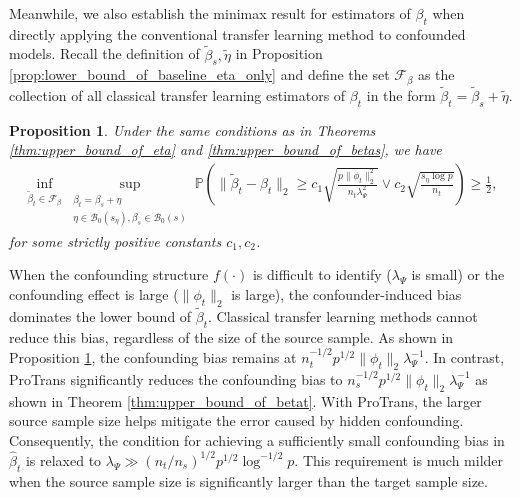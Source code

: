 \documentclass[12pt]{article}
\newtheorem{prop}{Proposition}
\begin{document}
Meanwhile, we also establish the minimax result for estimators of $\beta_t$ when directly applying the conventional transfer learning method to confounded models. Recall the definition of $\tilde{\beta}_s,\tilde{\eta}$ in Proposition \ref{prop:lower_bound_of_baseline_eta_only} and define the set $\mathcal{F}_\beta$ as the collection of all classical transfer learning estimators of $\beta_t$ in the form $ \tilde{\beta}_t = \tilde{\beta}_s +\tilde{\eta}$.
\begin{prop}
     \label{prop:lower_bound_of_baseline_eta}
     Under the same conditions as in Theorems \ref{thm:upper_bound_of_eta} and \ref{thm:upper_bound_of_betas}, we have %
     \begin{align*}
       \inf_{\tilde{\beta}_t\in \mathcal{F}_\beta}\underset{\substack{\beta_t = \beta_s + \eta \\ \eta \in \mathcal{B}_0(s_\eta),\beta_s\in \mathcal{B}_0(s)}}{\sup}\mathbb{P}\left(\|\tilde{\beta}_t - \beta_t\|_2 \ge c_1 \sqrt{\frac{p\|\phi_t\|_2^2}{n_t\lambda_\Psi^2} }\vee c_2\sqrt{\frac{s_\eta\log p}{n_t}} \right)\ge \frac{1}{2},
     \end{align*}
     for some strictly positive constants $c_1,c_2$. 
\end{prop}



When the confounding structure $f(\cdot)$ is difficult to identify ($\lambda_\Psi$ is small) or the confounding effect is large ($\|\phi_t\|_2$ is large), the confounder-induced bias dominates the lower bound of $\tilde{\beta}_t$. Classical transfer learning methods cannot reduce this bias, regardless of the size of the source sample. As shown in Proposition \ref{prop:lower_bound_of_baseline_eta}, the confounding bias remains at $n_t^{-1/2}p^{1/2}\|\phi_t\|_2\lambda^{-1}_\Psi$. In contrast, ProTrans significantly reduces the confounding bias to $n_s^{-1/2}p^{1/2}\|\phi_t\|_2\lambda^{-1}_\Psi$ as shown in Theorem \ref{thm:upper_bound_of_betat}. With ProTrans, the larger source sample size helps mitigate the error caused by hidden confounding. Consequently, the condition for achieving a sufficiently small confounding bias in $\hat{\beta}_t$ is relaxed to $\lambda_\Psi \gg (n_t/n_s)^{1/2} p^{1/2}\log^{-1/2}p$. This requirement is much milder when the source sample size is significantly larger than the target sample size.
\end{document}
